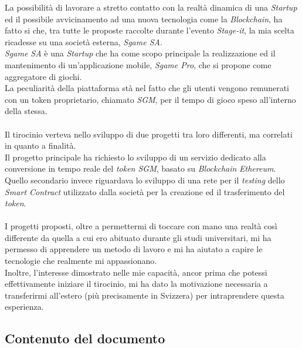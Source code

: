 \documentclass[11pt]{thesistemp}
\begin{document}
La possibilità di lavorare a stretto contatto con la realtà dinamica di una \textit{Startup} ed il possibile avvicinamento ad una nuova tecnologia come la \textit{Blockchain}, ha fatto si che, tra tutte le proposte raccolte durante l'evento \textit{Stage-it}, la mia scelta ricadesse su una società esterna, \textit{Sgame SA}.\\
\textit{Sgame SA} è una \textit{Startup} che ha come scopo principale la realizzazione ed il mantenimento di un'applicazione mobile, \textit{Sgame Pro}, che si propone come aggregatore di giochi.\\
La peculiarità della piattaforma stà nel fatto che gli utenti vengono remunerati con un token proprietario, chiamato \textit{SGM}, per il tempo di gioco speso all'interno della stessa.\\\\
Il tirocinio verteva nello sviluppo di due progetti tra loro differenti, ma correlati in quanto a finalità.\\
Il progetto principale ha richiesto lo sviluppo di un servizio dedicato alla conversione in tempo reale del \textit{token SGM}, basato su \textit{Blockchain} \textit{Ethereum}.\\
Quello secondario invece riguardava lo sviluppo di una rete per il \textit{testing} dello \textit{Smart Contract} utilizzato dalla società per la creazione ed il trasferimento del \textit{token}.\\\\
I progetti proposti, oltre a permettermi di toccare con mano una realtà così differente da quella a cui ero abituato durante gli studi universitari, mi ha permesso di apprendere un metodo di lavoro e mi ha aiutato a capire le tecnologie che realmente mi appassionano.\\
Inoltre, l'interesse dimostrato nelle mie capacità, ancor prima che potessi effettivamente iniziare il tirocinio, mi ha dato la motivazione necessaria a transferirmi all'estero (più precisamente in Svizzera) per intraprendere questa esperienza.\\
\pagebreak

\subsection{Contenuto del documento}
\end{document}
